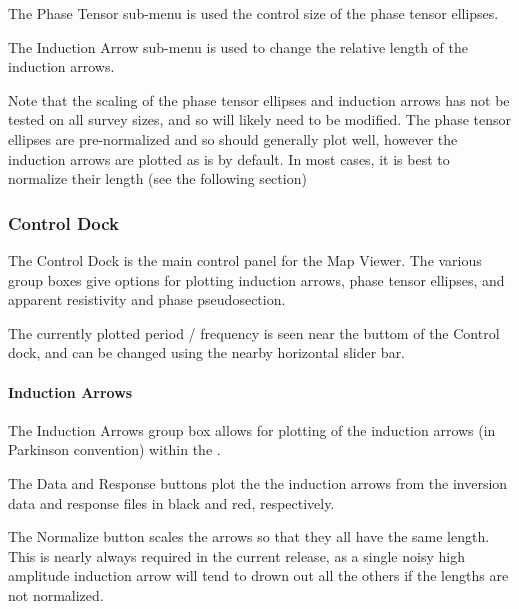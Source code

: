 \documentclass[letterpaper,10pt,english]{sphinxmanual}
\begin{document}
The Phase Tensor sub-menu is used the control size of the phase tensor ellipses.

The Induction Arrow sub-menu is used to change the relative length of the induction arrows.

Note that the scaling of the phase tensor ellipses and induction arrows has not be tested on all survey sizes, and so will likely need to be modified. The phase tensor ellipses are pre-normalized and so should generally plot well, however the induction arrows are plotted as is by default. In most cases, it is best to normalize their length (see the following section)


\subsubsection{Control Dock}
\label{\detokenize{content/data_plot/map_viewer:control-dock}}\label{\detokenize{content/data_plot/map_viewer:id1}}
\begin{figure}[htbp]
\centering

\noindent{}
\end{figure}

The Control Dock is the main control panel for the Map Viewer. The various group boxes give options for plotting induction arrows, phase tensor ellipses, and apparent resistivity and phase pseudosection.

The currently plotted period / frequency is seen near the buttom of the Control dock, and can be changed using the nearby horizontal slider bar.


\paragraph{Induction Arrows}
\label{\detokenize{content/data_plot/map_viewer:induction-arrows}}
The Induction Arrows group box allows for plotting of the induction arrows (in Parkinson convention) within the {\hyperref[\detokenize{content/data_plot/map_viewer:map-window}]{}}.

The Data and Response buttons plot the the induction arrows from the inversion data and response files in black and red, respectively.

The Normalize button scales the arrows so that they all have the same length. This is nearly always required in the current release, as a single noisy high amplitude induction arrow will tend to drown out all the others if the lengths are not normalized.
\end{document}
